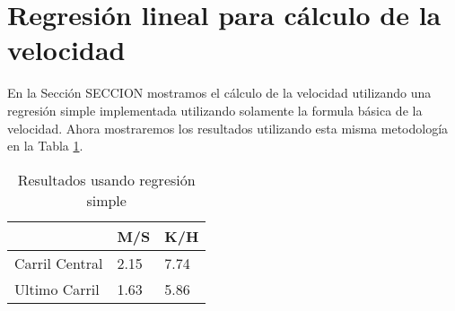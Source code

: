 \section{Regresión lineal para cálculo de la velocidad}

En la Sección SECCION mostramos el cálculo de la velocidad utilizando una regresión simple implementada utilizando solamente la formula básica de la velocidad. Ahora mostraremos los resultados utilizando esta misma metodología en la Tabla \ref{tab:resultadosRLS}.

\begin{table}[H]
    \centering
    \caption{Resultados usando regresión simple}
    \label{tab:resultadosRLS}
    \begin{tabular}{|l|l|l|}
    \hline
         & M/S & K/H \\ \hline
        Carril Central & 2.15 & 7.74 \\ \hline
        Ultimo Carril & 1.63 & 5.86 \\ \hline
    \end{tabular}
\end{table}
